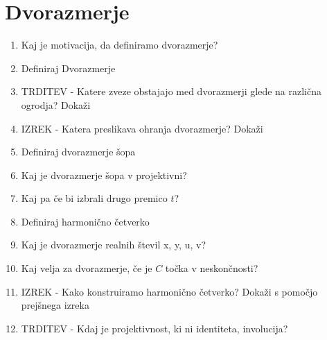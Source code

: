 \documentclass{article}
\begin{document}
    \section{Dvorazmerje}
    \begin{enumerate}
        \item Kaj je motivacija, da definiramo dvorazmerje?
        \item Definiraj Dvorazmerje
        \item TRDITEV - Katere zveze obstajajo med dvorazmerji glede na različna ogrodja? Dokaži
        \item IZREK - Katera preslikava ohranja dvorazmerje? Dokaži
        \item Definiraj dvorazmerje šopa
        \item Kaj je dvorazmerje šopa v projektivni?
        \item Kaj pa če bi izbrali drugo premico $t$?
        \item Definiraj harmonično četverko
        \item Kaj je dvorazmerje realnih števil x, y, u, v?
        \item Kaj velja za dvorazmerje, če je $C$ točka v neskončnosti?
        \item IZREK - Kako konstruiramo harmonično četverko? Dokaži s pomočjo prejšnega izreka
        \item TRDITEV - Kdaj je projektivnost, ki ni identiteta, involucija?
    \end{enumerate}
\end{document}
